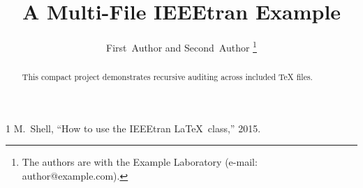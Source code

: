 \documentclass[journal,twocolumn]{IEEEtran}
\title{A Multi-File IEEEtran Example}
\author{First~Author and Second~Author%
\thanks{The authors are with the Example Laboratory (e-mail: author@example.com).}}
\begin{document}
\maketitle

\begin{abstract}
This compact project demonstrates recursive auditing across included TeX files.
\end{abstract}



\begin{thebibliography}{1}
M.~Shell, ``How to use the IEEEtran \LaTeX\ class,'' 2015.
\end{thebibliography}
\end{document}
